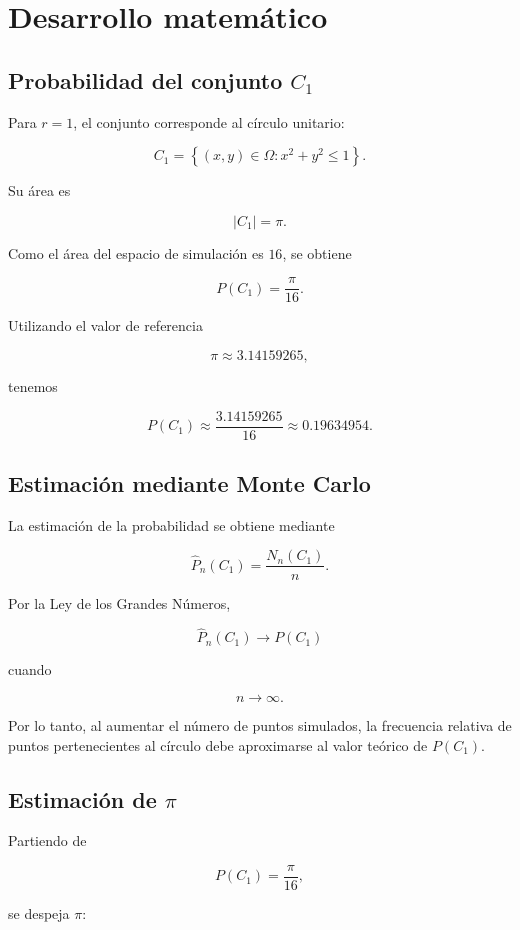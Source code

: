 \documentclass[12pt,a4paper]{article}
\begin{document}
\section{Desarrollo matemático}

\subsection{Probabilidad del conjunto \(C_1\)}

Para \(r=1\), el conjunto corresponde al círculo unitario:

\[
C_1=
\left\{
(x,y)\in\Omega:
x^2+y^2\leq1
\right\}.
\]

Su área es

\[
|C_1|=\pi.
\]

Como el área del espacio de simulación es \(16\), se obtiene

\[
P(C_1)
=
\frac{\pi}{16}.
\]

Utilizando el valor de referencia

\[
\pi\approx3.14159265,
\]

tenemos

\[
P(C_1)
\approx
\frac{3.14159265}{16}
\approx
0.19634954.
\]

\subsection{Estimación mediante Monte Carlo}

La estimación de la probabilidad se obtiene mediante

\[
\widehat{P}_n(C_1)
=
\frac{N_n(C_1)}{n}.
\]

Por la Ley de los Grandes Números,

\[
\widehat{P}_n(C_1)
\longrightarrow
P(C_1)
\]

cuando

\[
n\longrightarrow\infty.
\]

Por lo tanto, al aumentar el número de puntos simulados, la frecuencia
relativa de puntos pertenecientes al círculo debe aproximarse al valor
teórico de \(P(C_1)\).

\subsection{Estimación de \(\pi\)}

Partiendo de

\[
P(C_1)=\frac{\pi}{16},
\]

se despeja \(\pi\):
\end{document}
